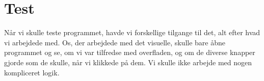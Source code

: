 \section{Test}
Når vi skulle teste programmet, havde vi forskellige tilgange til det, alt efter hvad vi arbejdede med. Os, der arbejdede med det visuelle, skulle bare åbne programmet og se, om vi var tilfredse med overfladen, og om de diverse knapper gjorde som de skulle, når vi klikkede på dem. Vi skulle ikke arbejde med nogen kompliceret logik. 